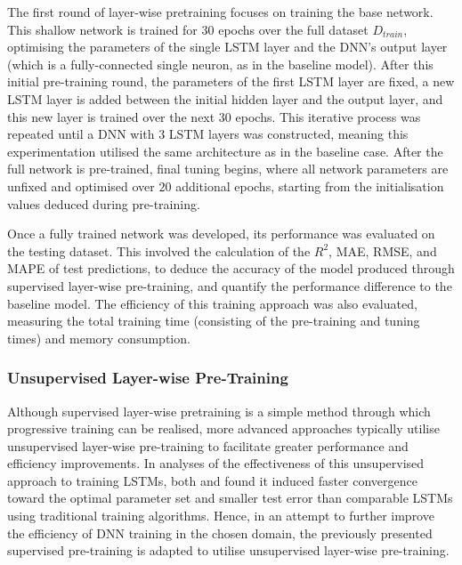 \documentclass[a4paper, 11pt]{report}
\begin{document}
    The first round of layer-wise pretraining focuses on training the base network. This shallow network is trained for $30$ epochs over the full dataset $D_{train}$, optimising the parameters of the single LSTM layer and the DNN's output layer (which is a fully-connected single neuron, as in the baseline model). After this initial pre-training round, the parameters of the first LSTM layer are fixed, a new LSTM layer is added between the initial hidden layer and the output layer, and this new layer is trained over the next $30$ epochs. This iterative process was repeated until a DNN with $3$ LSTM layers was constructed, meaning this experimentation utilised the same architecture as in the baseline case. After the full network is pre-trained, final tuning begins, where all network parameters are unfixed and optimised over $20$ additional epochs, starting from the initialisation values deduced during pre-training.

    Once a fully trained network was developed, its performance was evaluated on the testing dataset. This involved the calculation of the $R^2$, MAE, RMSE, and MAPE of test predictions, to deduce the accuracy of the model produced through supervised layer-wise pre-training, and quantify the performance difference to the baseline model. The efficiency of this training approach was also evaluated, measuring the total training time (consisting of the pre-training and tuning times) and memory consumption.


    \subsubsection{Unsupervised Layer-wise Pre-Training}

    Although supervised layer-wise pretraining is a simple method through which progressive training can be realised, more advanced approaches typically utilise unsupervised layer-wise pre-training to facilitate greater performance and efficiency improvements. In analyses of the effectiveness of this unsupervised approach to training LSTMs, both \citet{xu-2018} and \citet{sagheer-2019} found it induced faster convergence toward the optimal parameter set and smaller test error than comparable LSTMs using traditional training algorithms. Hence, in an attempt to further improve the efficiency of DNN training in the chosen domain, the previously presented supervised pre-training is adapted to utilise unsupervised layer-wise pre-training.
\end{document}
